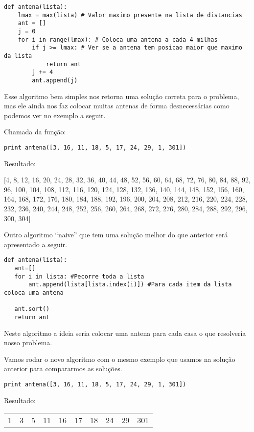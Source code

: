 \documentclass[11pt]{article}
\begin{document}
\begin{verbatim}
def antena(lista):
    lmax = max(lista) # Valor maximo presente na lista de distancias
    ant = []
    j = 0
    for i in range(lmax): # Coloca uma antena a cada 4 milhas
        if j >= lmax: # Ver se a antena tem posicao maior que maximo da lista
            return ant
        j += 4
        ant.append(j)
\end{verbatim}

Esse algoritmo bem simples nos retorna uma solução correta para o
problema, mas ele ainda nos faz colocar muitas antenas de forma
desnecessárias como podemos ver no exemplo a seguir.

Chamada da função:
\begin{verbatim}
print antena([3, 16, 11, 18, 5, 17, 24, 29, 1, 301])
\end{verbatim}

Resultado:

[4, 8, 12, 16, 20, 24, 28, 32, 36, 40, 44, 48, 52, 56, 60, 64, 68, 72, 76, 80, 84, 88, 92, 96, 100, 104, 108, 112, 116, 120, 124, 128, 132, 136, 140, 144, 148, 152, 156, 160, 164, 168, 172, 176, 180, 184, 188, 192, 196, 200, 204, 208, 212, 216, 220, 224, 228, 232, 236, 240, 244, 248, 252, 256, 260, 264, 268, 272, 276, 280, 284, 288, 292, 296, 300, 304]

Outro algoritmo ``naive'' que tem uma solução melhor do que anterior será apresentado a seguir.

\begin{verbatim}
def antena(lista):
   ant=[]
   for i in lista: #Pecorre toda a lista
       ant.append(lista[lista.index(i)]) #Para cada item da lista coloca uma antena

   ant.sort()
   return ant
\end{verbatim}

Neste algoritmo a ideia seria colocar uma antena para cada casa o que
resolveria nosso problema.

Vamos rodar o novo algoritmo com o mesmo exemplo que usamos na solução
anterior para compararmos as soluções.

\begin{verbatim}
print antena([3, 16, 11, 18, 5, 17, 24, 29, 1, 301])
\end{verbatim}


Resultado:
\begin{center}
\begin{tabular}{rrrrrrrrrr}
1 & 3 & 5 & 11 & 16 & 17 & 18 & 24 & 29 & 301\\
\end{tabular}
\end{center}
\end{document}
